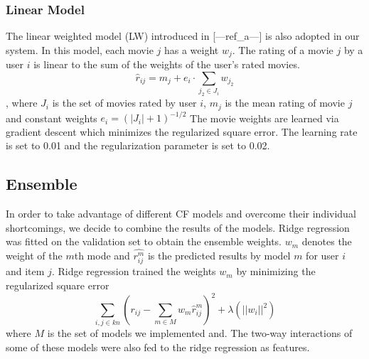 \documentclass[10pt,conference,compsocconf]{IEEEtran}
\begin{document}
\subsubsection{Linear Model}
The linear weighted model (LW) introduced in [---ref\_a---] is also adopted in our system. In this model, each movie $j$ has a weight $w_j$. The rating of a movie $j$ by a user $i$ is linear to the sum of the weights of the user's rated movies.
\[{\hat r_{ij}} = {m_j} + {e_i} \cdot \sum\limits_{{j_2} \in {J_i}} {{w_{{j_2}}}} \]
, where $J_i$ is the set of movies rated by user $i$, $m_j$ is the mean rating of movie $j$ and constant weights ${e_i} = {(\left| {{J_i}} \right| + 1)^{ - 1/2}}$
The movie weights are learned via gradient descent which minimizes the regularized square error. The learning rate is set to 0.01 and the regularization parameter is set to 0.02.

%

\subsection{Ensemble}
In order to take advantage of different CF models and overcome their individual shortcomings, we decide to combine the results of the models. Ridge regression was fitted on the validation set to obtain the ensemble weights. $w_m$ denotes the weight of the $m$th mode and $\hat{r_{ij}^m}$ is the predicted results by model $m$ for user $i$ and item $j$. Ridge regression trained the weights $w_m$ by minimizing the regularized square error
$$  \sum_{i, j\in kn} (r_{ij} - \sum_{m\in M}w_m\hat r_{ij}^m)^2 + \lambda (||w_i||^2)  $$
where $M$ is the set of models we implemented and. The two-way interactions of some of these models were also fed to the ridge regression as features.
\end{document}
